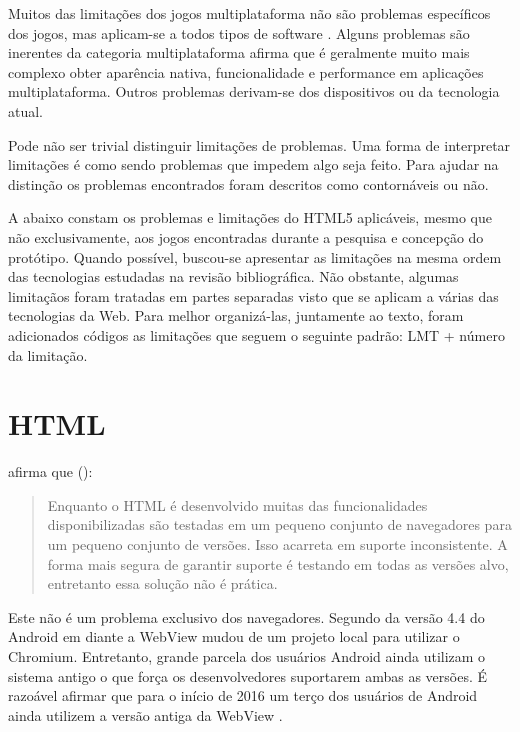 
Muitos das limitações dos jogos multiplataforma não são
problemas específicos dos jogos, mas aplicam-se a todos tipos
de software \autocite[p. 3]{currentStateCrossPlatform}. Alguns
problemas são inerentes da categoria multiplataforma \citet[p.
7 ]{viabilityBusinessApplications} afirma que é geralmente muito
mais complexo obter aparência nativa, funcionalidade e performance
em aplicações multiplataforma. Outros problemas derivam-se dos
dispositivos ou da tecnologia atual.

Pode não ser trivial distinguir limitações de
problemas. Uma forma de interpretar limitações é como sendo problemas
que impedem algo seja feito. Para ajudar na distinção os
problemas encontrados foram descritos como contornáveis ou não.

A abaixo constam os problemas e limitações do HTML5 aplicáveis,
mesmo que não exclusivamente, aos jogos encontradas durante a pesquisa
e concepção do protótipo. Quando possível, buscou-se apresentar
as limitações na mesma ordem das tecnologias estudadas na revisão
bibliográfica. Não obstante, algumas limitaçãos foram tratadas em
partes separadas visto que se aplicam a várias das tecnologias da
Web. Para melhor organizá-las, juntamente ao texto, foram adicionados
códigos as limitações que seguem o seguinte padrão: LMT + número da
limitação.

\section{HTML}

\citet{crossPlatformMobileGame} afirma que ():
\begin{quote}
Enquanto o HTML é desenvolvido muitas das funcionalidades
disponibilizadas são testadas em um pequeno conjunto de navegadores
para um pequeno conjunto de versões. Isso acarreta em suporte
inconsistente. A forma mais segura de garantir suporte é testando em
todas as versões alvo, entretanto essa solução não é prática.
\end{quote}

Este não é um problema exclusivo dos navegadores. Segundo
\citet{chromeWebView} da versão 4.4 do Android em diante a WebView
mudou de um projeto local para utilizar o Chromium. Entretanto, grande
parcela dos usuários Android ainda utilizam o sistema antigo o que
força os desenvolvedores suportarem ambas as versões. É razoável
afirmar que para o início de 2016 um terço dos usuários de Android
ainda utilizem a versão antiga da WebView \autocite{chromeWebView}.

